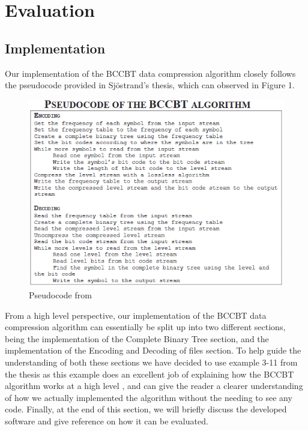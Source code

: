 \documentclass[12pt]{IEEEtran}
\begin{document}
\section{Evaluation}

\subsection{Implementation}
Our implementation of the BCCBT data compression algorithm closely follows the pseudocode provided in Sjöstrand's thesis,
which can observed in Figure 1.
\begin{figure}[h]
\centering
\includegraphics[scale=0.55]{../presentation/images/pseudocode.PNG}
\caption{Pseudocode from \cite{Sjostrand}}
\end{figure}
From a high level perspective, our implementation of the BCCBT data compression algorithm can essentially be split up into two different sections,
being the implementation of the Complete Binary Tree section, and the implementation of the Encoding and Decoding of files section.
To help guide the understanding of both these sections we have decided to use example 3-11 from the thesis as this example does an excellent job of explaining
how the BCCBT algorithm works at a high level \cite{Sjostrand}, and can give the reader a clearer understanding of how we actually implemented the algorithm
without the needing to see any code.
Finally, at the end of this section, we will briefly discuss the developed software and give reference on how it can be evaluated. \\
\end{document}
